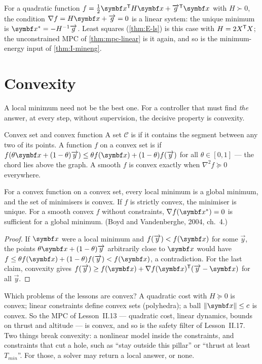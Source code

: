 For a quadratic function $f = \tfrac12\vx^\T H\vx + \vec g^\T\vx$ with $H \succ 0$, the condition $\nabla f = H\vx + \vec g = 0$ is a linear system: the unique minimum is $\vx^* = -H^{-1}\vec g$. Least squares (\cref{thm:E-ls}) is this case with $H = 2X^{\mathsf{T}} X$; the unconstrained MPC of \cref{thm:mpc-linear} is it again, and so is the minimum-energy input of \cref{thm:I-mineng}.

\section{Convexity}

A local minimum need not be the best one. For a controller that must find \emph{the} answer, at every step, without supervision, the decisive property is convexity.

\begin{definition}{Convex set and convex function}
A set $\mathcal C$ is  if it contains the segment between any two of its points. A function $f$ on a convex set is  if $f(\theta\vx + (1 - \theta)\vec y) \le \theta f(\vx) + (1 - \theta)f(\vec y)$ for all $\theta \in [0, 1]$ — the chord lies above the graph. A smooth $f$ is convex exactly when $\nabla^2f \succeq 0$ everywhere.
\end{definition}

\begin{theorem}
\label{thm:J-convex}
For a convex function on a convex set, every local minimum is a global minimum, and the set of minimisers is convex. If $f$ is strictly convex, the minimiser is unique. For a smooth convex $f$ without constraints, $\nabla f(\vx^*) = 0$ is sufficient for a global minimum. (Boyd and Vandenberghe, 2004, ch.~4.)
\end{theorem}
\begin{proof}
If $\vx$ were a local minimum and $f(\vec y) < f(\vx)$ for some $\vec y$, the points $\theta\vx + (1 - \theta)\vec y$ arbitrarily close to $\vx$ would have $f \le \theta f(\vx) + (1 - \theta)f(\vec y) < f(\vx)$, a contradiction. For the last claim, convexity gives $f(\vec y) \ge f(\vx) + \nabla f(\vx)^\T(\vec y - \vx)$ for all $\vec y$.
\end{proof}

Which problems of the lessons are convex? A quadratic cost with $H \succeq 0$ is convex; linear constraints define convex sets (polyhedra); a ball $\|\vx\| \le c$ is convex. So the MPC of Lesson~II.13 — quadratic cost, linear dynamics, bounds on thrust and altitude — is convex, and so is the safety filter of Lesson~II.17. Two things break convexity: a nonlinear model inside the constraints, and constraints that cut a hole, such as \enquote{stay outside this pillar} or \enquote{thrust at least $T_{min}$}. For those, a solver may return a local answer, or none.

